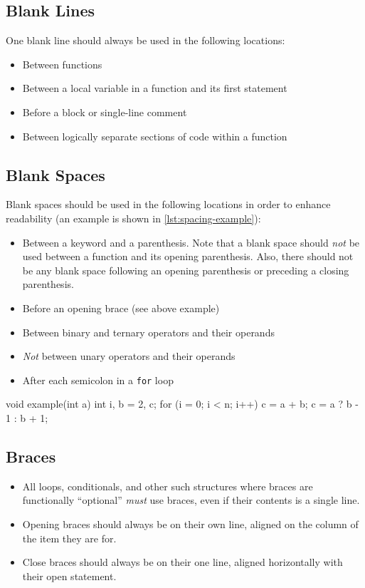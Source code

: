 \documentclass[StyleGuide.tex]{subfiles}
\begin{document}
\subsection{Blank Lines}\label{blank-lines}

One blank line should always be used in the following locations:

\begin{itemize}
\item
  Between functions
\item
  Between a local variable in a function and its first statement
\item
  Before a block or single-line comment
\item
  Between logically separate sections of code within a function
\end{itemize}

\subsection{Blank Spaces}\label{blank-spaces}

Blank spaces should be used in the following locations in order to enhance
readability (an example is shown in \autoref{lst:spacing-example}):

\begin{itemize}
\item
  Between a keyword and a parenthesis. Note that a blank space should
  \emph{not} be used between a function and its opening parenthesis. Also,
  there should not be any blank space following an opening parenthesis
  or preceding a closing parenthesis.
\item
  Before an opening brace (see above example)
\item
  Between binary and ternary operators and their operands
\item
  \emph{Not} between unary operators and their operands
\item
  After each semicolon in a \texttt{for} loop
\end{itemize}

\begin{code}[caption=Spacing example, label=lst:spacing-example]
void example(int a) {
	int i, b = 2, c;
	for (i = 0; i < n; i++) {
		c = a + b;
		c = a ? b - 1 : b + 1;
	}
}
\end{code}

\subsection{Braces}\label{braces}

\begin{itemize}
\item
  All loops, conditionals, and other such structures where braces are
  functionally ``optional'' \emph{must} use braces, even if their
  contents is a single line.
\item
  Opening braces should always be on their own line, aligned on the
  column of the item they are for.
\item
  Close braces should always be on their one line, aligned horizontally
  with their open statement.
\end{itemize}
\end{document}
